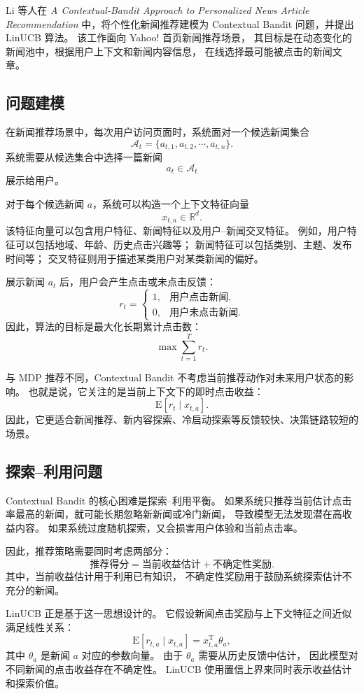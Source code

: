 \documentclass[11pt]{ctexart}
\begin{document}
Li 等人在
\textit{A Contextual-Bandit Approach to Personalized News Article Recommendation}
中，将个性化新闻推荐建模为 Contextual Bandit 问题，并提出 LinUCB 算法。
该工作面向 Yahoo! 首页新闻推荐场景，
其目标是在动态变化的新闻池中，根据用户上下文和新闻内容信息，
在线选择最可能被点击的新闻文章。

\subsection{问题建模}

在新闻推荐场景中，每次用户访问页面时，系统面对一个候选新闻集合
\[
\mathcal{A}_t=\{a_{t,1},a_{t,2},\cdots,a_{t,n}\}.
\]
系统需要从候选集合中选择一篇新闻
\[
a_t\in\mathcal{A}_t
\]
展示给用户。

对于每个候选新闻 $a$，系统可以构造一个上下文特征向量
\[
x_{t,a}\in\mathbb{R}^{d}.
\]
该特征向量可以包含用户特征、新闻特征以及用户--新闻交叉特征。
例如，用户特征可以包括地域、年龄、历史点击兴趣等；
新闻特征可以包括类别、主题、发布时间等；
交叉特征则用于描述某类用户对某类新闻的偏好。

展示新闻 $a_t$ 后，用户会产生点击或未点击反馈：
\[
r_t=
\begin{cases}
1, & \text{用户点击新闻},\\
0, & \text{用户未点击新闻}.
\end{cases}
\]
因此，算法的目标是最大化长期累计点击数：
\[
\max \sum_{t=1}^{T} r_t.
\]

与 MDP 推荐不同，Contextual Bandit 不考虑当前推荐动作对未来用户状态的影响。
也就是说，它关注的是当前上下文下的即时点击收益：
\[
\mathrm{E}[r_t\mid x_{t,a}].
\]
因此，它更适合新闻推荐、新内容探索、冷启动探索等反馈较快、决策链路较短的场景。

\subsection{探索--利用问题}

Contextual Bandit 的核心困难是探索--利用平衡。
如果系统只推荐当前估计点击率最高的新闻，就可能长期忽略新新闻或冷门新闻，
导致模型无法发现潜在高收益内容。
如果系统过度随机探索，又会损害用户体验和当前点击率。

因此，推荐策略需要同时考虑两部分：
\[
\text{推荐得分}
=
\text{当前收益估计}
+
\text{不确定性奖励}.
\]
其中，当前收益估计用于利用已有知识，
不确定性奖励用于鼓励系统探索估计不充分的新闻。

LinUCB 正是基于这一思想设计的。
它假设新闻点击奖励与上下文特征之间近似满足线性关系：
\[
\mathrm{E}[r_{t,a}\mid x_{t,a}]
=
x_{t,a}^{\mathrm{T}}\theta_a,
\]
其中 $\theta_a$ 是新闻 $a$ 对应的参数向量。
由于 $\theta_a$ 需要从历史反馈中估计，
因此模型对不同新闻的点击收益存在不确定性。
LinUCB 使用置信上界来同时表示收益估计和探索价值。
\end{document}
